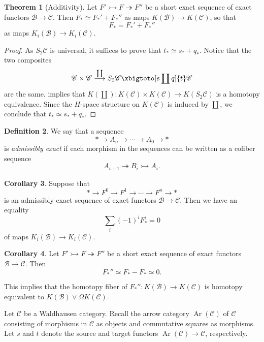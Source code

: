 \documentclass[10pt,letterpaper,cm]{nupset}
\theoremstyle{definition}
\newtheorem{definition}{Definition}[section]
\theoremstyle{theorem}
\newtheorem{theorem}[definition]{Theorem}
\newtheorem{corollary}[definition]{Corollary}
\theoremstyle{remark}
\newcommand{\1}{\mathbf{1}}
\renewcommand{\b}{\mathscr{B}}
\renewcommand{\c}{\mathscr{C}}
\newcommand{\0}{\vec 0}
\DeclareMathOperator{\Ar}{Ar}
\begin{document}
\begin{theorem}[Additivity]\label{add}
Let $F' \rightarrowtail F \twoheadrightarrow F''$ be a short exact sequence of exact functors $\b \to \c$. Then $F_{\ast} \simeq F_{\ast}' + F_{\ast}''$ as maps $K(\b) \to K(\c)$, so that $$F_{\ast} = F_{\ast}' + F_{\ast}''$$ as maps $K_i(\b) \to K_i(\c)$. 
\end{theorem}
\begin{proof}
As $S_2{\c}$ is universal, it suffices to prove that $t_{\ast}  \simeq s_{\ast} + q_{\ast}$. Notice that the two composites $$\c \times \c \overset{\coprod}{\longrightarrow} S_2{\c} \xbigtoto[s \coprod q]{t} \c$$ are the same.  implies that $K\left(\coprod\right): K(\c) \times K(\c) \to K(S_2{\c})$ is a homotopy equivalence. Since the $H$-space structure on $K(\c)$ is induced by $\coprod$, we conclude that $t_{\ast}  \simeq s_{\ast} + q_{\ast}$. 
\end{proof}

\begin{definition}
 We say that a sequence $$\ast \to A_n \to \cdots \to A_0 \to \ast$$ is \textit{admissibly exact} if each morphism in the sequences can be written as a cofiber sequence $$A_{i+1} \twoheadrightarrow B_i \rightarrowtail A_i.$$
\end{definition}

\begin{corollary}
Suppose that $$\ast \to F^0 \to F^1 \to \cdots \to F^n \to \ast$$ is an admissibly exact sequence of exact functors $\b \to \c$. Then we have an equality $$\sum_i ({-1})^iF_{\ast}^i = 0$$ of maps $K_i(\b) \to K_i(\c)$.
\end{corollary}

\begin{corollary}
Let $F' \rightarrowtail F \twoheadrightarrow F''$ be a short exact sequence of exact functors $\b \to \c$. Then $$F_{\ast}'' \simeq F_{\ast} - F_{\ast} \simeq 0.$$ 
\end{corollary}

This implies that the homotopy fiber of $F_{\ast}'' : K(\b) \to K(\c)$ is homotopy equivalent to $K(\b) \vee \Omega K(\c)$.

\bigskip

Let $\c$ be a Waldhausen category. Recall the arrow category $\Ar(\c)$ of $\c$ consisting of morphisms in $\c$ as objects and commutative squares as morphisms. Let $s$ and $t$ denote the source and target functors $\Ar(\c)\to \c$, respectively. 
\end{document}
